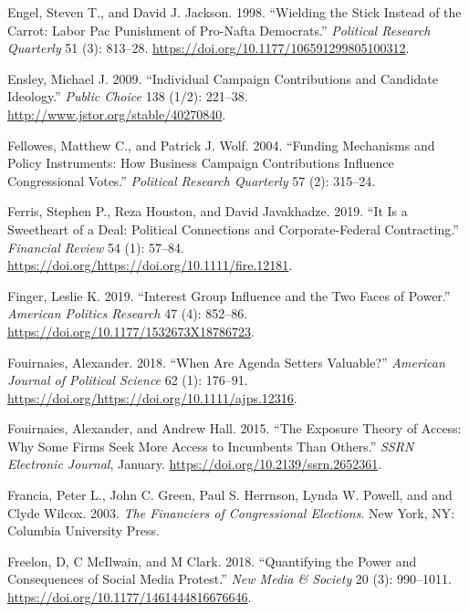 \documentclass[12pt,]{article}
\begin{document}
\leavevmode\hypertarget{ref-engel1998}{}%
Engel, Steven T., and David J. Jackson. 1998. ``Wielding the Stick
Instead of the Carrot: Labor Pac Punishment of Pro-Nafta Democrats.''
\emph{Political Research Quarterly} 51 (3): 813--28.
\url{https://doi.org/10.1177/106591299805100312}.

\leavevmode\hypertarget{ref-ensley2009}{}%
Ensley, Michael J. 2009. ``Individual Campaign Contributions and
Candidate Ideology.'' \emph{Public Choice} 138 (1/2): 221--38.
\url{http://www.jstor.org/stable/40270840}.

\leavevmode\hypertarget{ref-fellowes2004}{}%
Fellowes, Matthew C., and Patrick J. Wolf. 2004. ``Funding Mechanisms
and Policy Instruments: How Business Campaign Contributions Influence
Congressional Votes.'' \emph{Political Research Quarterly} 57 (2):
315--24.

\leavevmode\hypertarget{ref-ferris2019}{}%
Ferris, Stephen P., Reza Houston, and David Javakhadze. 2019. ``It Is a
Sweetheart of a Deal: Political Connections and Corporate-Federal
Contracting.'' \emph{Financial Review} 54 (1): 57--84.
\url{https://doi.org/https://doi.org/10.1111/fire.12181}.

\leavevmode\hypertarget{ref-finger2019}{}%
Finger, Leslie K. 2019. ``Interest Group Influence and the Two Faces of
Power.'' \emph{American Politics Research} 47 (4): 852--86.
\url{https://doi.org/10.1177/1532673X18786723}.

\leavevmode\hypertarget{ref-fouirnaies2018}{}%
Fouirnaies, Alexander. 2018. ``When Are Agenda Setters Valuable?''
\emph{American Journal of Political Science} 62 (1): 176--91.
\url{https://doi.org/https://doi.org/10.1111/ajps.12316}.

\leavevmode\hypertarget{ref-fouirnaies2015}{}%
Fouirnaies, Alexander, and Andrew Hall. 2015. ``The Exposure Theory of
Access: Why Some Firms Seek More Access to Incumbents Than Others.''
\emph{SSRN Electronic Journal}, January.
\url{https://doi.org/10.2139/ssrn.2652361}.

\leavevmode\hypertarget{ref-francia2003}{}%
Francia, Peter L., John C. Green, Paul S. Herrnson, Lynda W. Powell, and
and Clyde Wilcox. 2003. \emph{The Financiers of Congressional
Elections}. New York, NY: Columbia University Press.

\leavevmode\hypertarget{ref-freelon2018}{}%
Freelon, D, C McIlwain, and M Clark. 2018. ``Quantifying the Power and
Consequences of Social Media Protest.'' \emph{New Media \& Society} 20
(3): 990--1011. \url{https://doi.org/10.1177/1461444816676646}.
\end{document}
